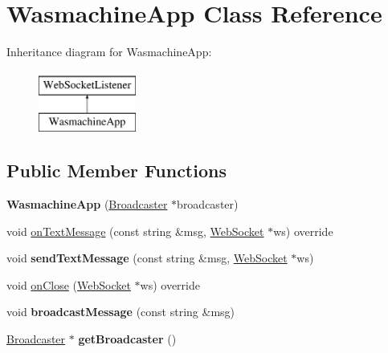 \hypertarget{class_wasmachine_app}{}\section{Wasmachine\+App Class Reference}
\label{class_wasmachine_app}
Inheritance diagram for Wasmachine\+App\+:\begin{figure}[H]
\begin{center}
\leavevmode
\includegraphics[height=2.000000cm]{class_wasmachine_app}
\end{center}
\end{figure}
\subsection*{Public Member Functions}
\begin{DoxyCompactItemize}
\item 
{\bfseries Wasmachine\+App} (\hyperlink{class_broadcaster}{Broadcaster} $\ast$broadcaster)\hypertarget{class_wasmachine_app_a31b563084ec85509613ecb590ada5e3b}{}\label{class_wasmachine_app_a31b563084ec85509613ecb590ada5e3b}

\item 
void \hyperlink{class_wasmachine_app_a259cd59762cb773cf84d4ba6e007cf16}{on\+Text\+Message} (const string \&msg, \hyperlink{class_web_socket}{Web\+Socket} $\ast$ws) override
\item 
void {\bfseries send\+Text\+Message} (const string \&msg, \hyperlink{class_web_socket}{Web\+Socket} $\ast$ws)\hypertarget{class_wasmachine_app_a9cab93c6a2013c8fff9d1d10965373fc}{}\label{class_wasmachine_app_a9cab93c6a2013c8fff9d1d10965373fc}

\item 
void \hyperlink{class_wasmachine_app_ab090e05b9c6f65dee323066cc169dc1a}{on\+Close} (\hyperlink{class_web_socket}{Web\+Socket} $\ast$ws) override
\item 
void {\bfseries broadcast\+Message} (const string \&msg)\hypertarget{class_wasmachine_app_a75c3d4e9212421f9e587be6f8831643b}{}\label{class_wasmachine_app_a75c3d4e9212421f9e587be6f8831643b}

\item 
\hyperlink{class_broadcaster}{Broadcaster} $\ast$ {\bfseries get\+Broadcaster} ()\hypertarget{class_wasmachine_app_a39959c6696735b05dabc8028966ed36f}{}\label{class_wasmachine_app_a39959c6696735b05dabc8028966ed36f}

\end{DoxyCompactItemize}


